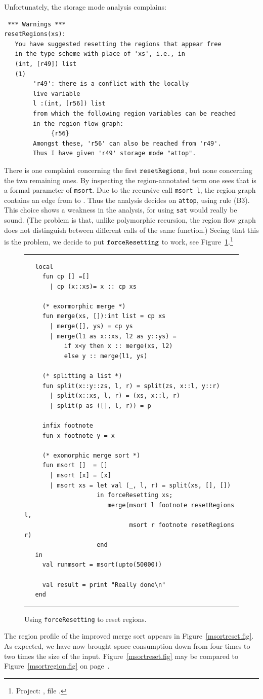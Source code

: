 \documentclass[12pt]{book}
\begin{document}
Unfortunately, the storage mode analysis complains:
\begin{verbatim}
 *** Warnings ***
resetRegions(xs): 
   You have suggested resetting the regions that appear free 
   in the type scheme with place of 'xs', i.e., in
   (int, [r49]) list
   (1)                                                    
        'r49': there is a conflict with the locally
        live variable
        l :(int, [r56]) list
        from which the following region variables can be reached 
        in the region flow graph:
             {r56}
        Amongst these, 'r56' can also be reached from 'r49'.
        Thus I have given 'r49' storage mode "attop".
\end{verbatim}
There is one complaint concerning the first $\hbox{\tt resetRegions}$, but none
concerning the two remaining ones.  By inspecting the region-annotated
term one sees that  is a formal parameter of {\tt msort}.
Due to the recursive call {\tt msort l}, the region graph contains an
edge from  to . Thus the analysis decides on
{\tt attop}, using rule (B3). This choice shows a weakness in the
analysis, for using {\tt sat} would really be sound. (The problem is
that, unlike polymorphic recursion, the region flow graph does not
distinguish between different calls of the same function.)  Seeing
that this is the problem, we decide to put $\hbox{\tt forceResetting}$ to work, see
Figure~\ref{force.fig}.\footnote{Project:
  , file
  .}
\begin{figure}
\hrule\medskip
\begin{verbatim}
   local
     fun cp [] =[]
       | cp (x::xs)= x :: cp xs

     (* exormorphic merge *)
     fun merge(xs, []):int list = cp xs
       | merge([], ys) = cp ys
       | merge(l1 as x::xs, l2 as y::ys) = 
           if x<y then x :: merge(xs, l2) 
           else y :: merge(l1, ys)

     (* splitting a list *)
     fun split(x::y::zs, l, r) = split(zs, x::l, y::r)
       | split(x::xs, l, r) = (xs, x::l, r)
       | split(p as ([], l, r)) = p

     infix footnote
     fun x footnote y = x

     (* exomorphic merge sort *)
     fun msort []  = []
       | msort [x] = [x]
       | msort xs = let val (_, l, r) = split(xs, [], [])
                    in forceResetting xs;
                       merge(msort l footnote resetRegions l, 
                             msort r footnote resetRegions r)
                    end
   in
     val runmsort = msort(upto(50000))

     val result = print "Really done\n"
   end
\end{verbatim}
\caption{Using {\tt forceResetting} to reset regions.}
\medskip
\hrule
\label{force.fig}
\end{figure}
The region profile of the improved merge sort appears in
Figure~\ref{msortreset.fig}. As expected, we have now brought space
consumption down from four times to two times the size of the input.
Figure~\ref{msortreset.fig} may be compared to
Figure~\ref{msortregion.fig} on page~\pageref{msortregion.fig}.
\end{document}
